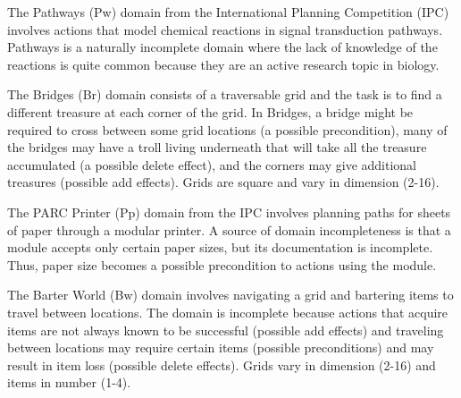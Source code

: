 \documentclass{article}
\begin{document}
The Pathways (Pw) domain from the International Planning Competition  (IPC) involves actions that model chemical reactions in signal
transduction pathways.  Pathways is a naturally incomplete domain where the lack
of knowledge of the reactions is quite common because they are an active
research topic in biology.  

The Bridges (Br) domain consists of a traversable grid and the task is to find a
different treasure at each corner of the grid. In Bridges,
a bridge might be required  to cross between some grid locations (a possible
precondition), many of the bridges may have a troll living
underneath that will take all the treasure accumulated (a possible delete
effect), and the corners may give additional treasures (possible add
effects).  Grids are square and vary in dimension (2-16).

The PARC Printer (Pp) domain from the IPC involves planning paths for sheets of
paper through a modular printer.  A source of domain incompleteness is that a module
accepts only certain paper sizes, but its documentation is incomplete.  Thus,
paper size becomes a possible precondition to actions using the module.

The Barter World (Bw) domain involves navigating a grid and bartering items to
travel between locations.  The domain is incomplete because actions that acquire
 items are not always known to be successful (possible add effects) and traveling between locations may require
certain items (possible preconditions) and may result in item loss
(possible delete effects). Grids vary in dimension (2-16) and items
in number (1-4).
\end{document}
